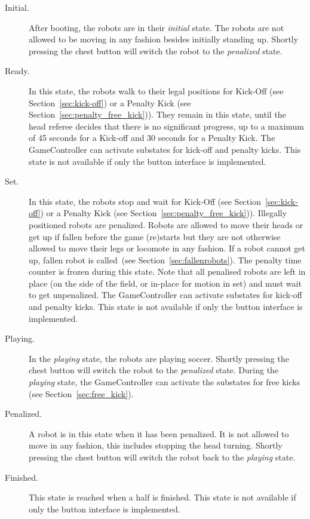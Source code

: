 \documentclass[12pt]{article}
\newcommand{\cf}{see\xspace}
\newcommand{\KickOffAutoTime}{45 seconds\xspace}
\newcommand{\PenaltyFreeKickSetupTime}{30 seconds\xspace}
\begin{document}
\begin{description}

\item[Initial.] After booting, the robots are in their \emph{initial} state. The robots are not allowed to be moving in any fashion besides initially standing up. Shortly pressing the chest button will switch the robot to the \emph{penalized} state.

\item[Ready.] In this state, the robots walk to their legal positions for Kick-Off  (\cf Section~\ref{sec:kick-off}) or a Penalty Kick (\cf Section~\ref{sec:penalty_free_kick})). They remain in this state, until the head referee decides that there is no significant progress, up to a maximum of \KickOffAutoTime for a Kick-off and \PenaltyFreeKickSetupTime for a Penalty Kick.
The GameController can activate substates for kick-off and penalty kicks.
This state is not available if only the button interface is implemented.

\item[Set.] In this state, the robots stop and wait for Kick-Off  (\cf Section~\ref{sec:kick-off}) or a Penalty Kick (\cf Section~\ref{sec:penalty_free_kick})).
Illegally positioned robots are penalized.
Robots are allowed to move their heads or get up if fallen before the game (re)starts but they are not otherwise allowed to move their legs or locomote in any fashion.
If a robot cannot get up, fallen robot is called~(\cf Section~\ref{sec:fallenrobots}).
The penalty time counter is frozen during this state.
Note that all penalised robots are left in place (on the side of the field, or in-place for motion in set) and must wait to get unpenalized.
The GameController can activate substates for kick-off and penalty kicks.
This state is not available if only the button interface is implemented.

\item[Playing.] In the \emph{playing} state, the robots are playing soccer. Shortly pressing the chest button will switch the robot to the \emph{penalized} state. During the \emph{playing} state, the GameController can activate the substates for free kicks (\cf Section~\ref{sec:free_kick}).

\item[Penalized.] A robot is in this state when it has been penalized. It is not allowed to move in any fashion,  this includes stopping the head turning. Shortly pressing the chest button will switch the robot back to the \emph{playing} state.

\item[Finished.] This state is reached when a half is finished. This state is not available if only the button interface is implemented.

\end{description}
\end{document}
